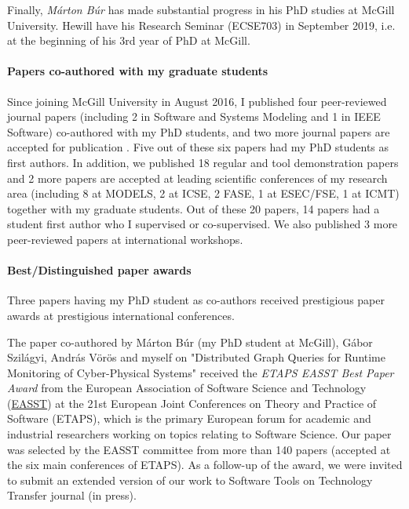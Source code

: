 Finally, \emph{Márton Búr} has made substantial progress in his PhD studies at McGill University. Hewill have his Research Seminar (ECSE703) in September 2019, i.e. at the beginning of his 3rd year of PhD at McGill. 

\paragraph{Papers co-authored with my graduate students}
Since joining McGill University in August 2016, I published four peer-reviewed journal papers \cite{act2017,sosym2017-mondo,sosym2017-tb,ieeesw2018} (including 2 in Software and Systems Modeling and 1 in IEEE Software) co-authored with my PhD students,  and two more journal papers are accepted for publication \cite{sttt-2019-cps,sttt-2019-div}. Five out of these six papers had my PhD students as first authors. 
In addition, we published 18 regular and tool demonstration papers and 2 more papers are accepted at leading scientific conferences of my research area (including 8 at MODELS, 2 at ICSE, 2 FASE, 1 at ESEC/FSE, 1 at ICMT) together with my graduate students. Out of these 20 papers,  14 papers had a student first author who I supervised or co-supervised. We also published 3 more peer-reviewed papers at international workshops.%

\paragraph{Best/Distinguished paper awards}
Three papers having my PhD student as co-authors received prestigious paper awards at prestigious international conferences. 

The paper co-authored by Márton Búr (my PhD student at McGill), Gábor Szilágyi, András Vörös and myself on "Distributed Graph Queries for Runtime Monitoring of Cyber-Physical Systems" \cite{fase2018-cps} received the \emph{ETAPS EASST Best Paper Award} from the European Association of Software Science and Technology (\href{http://easst.aulp.co.uk/}{EASST}) at the 21st European Joint Conferences on Theory and Practice of Software (ETAPS), which is the primary European forum for academic and industrial researchers working on topics relating to Software Science. Our paper was selected by the EASST committee from more than 140 papers (accepted at the six main conferences of ETAPS). As a follow-up of the award, we were invited to submit an extended version of our work to Software Tools on Technology Transfer journal \cite{sttt-2019-cps} (in press). 

